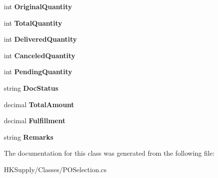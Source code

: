 \begin{DoxyCompactItemize}
int {\bfseries Original\+Quantity}
\item 
\mbox{\label{class_h_k_supply_1_1_classes_1_1_p_o_selection_a0173e2a46bcf6a7193c4f8f449b0e98b}} 
int {\bfseries Total\+Quantity}
\item 
\mbox{\label{class_h_k_supply_1_1_classes_1_1_p_o_selection_a4558c8fb6b03a0609eb6418b95196519}} 
int {\bfseries Delivered\+Quantity}
\item 
\mbox{\label{class_h_k_supply_1_1_classes_1_1_p_o_selection_afcdb48abdb867c3fa52f08087f1272ba}} 
int {\bfseries Canceled\+Quantity}
\item 
\mbox{\label{class_h_k_supply_1_1_classes_1_1_p_o_selection_a21b9c87f9ffe98fba310bdf41cff0dc4}} 
int {\bfseries Pending\+Quantity}
\item 
\mbox{\label{class_h_k_supply_1_1_classes_1_1_p_o_selection_abebcd2d0230ddd1c2f3ceb7cb1f999c5}} 
string {\bfseries Doc\+Status}
\item 
\mbox{\label{class_h_k_supply_1_1_classes_1_1_p_o_selection_a30c4ee4350eacd53e3174e827fb5be79}} 
decimal {\bfseries Total\+Amount}
\item 
\mbox{\label{class_h_k_supply_1_1_classes_1_1_p_o_selection_abea970042645a8f72b2b72b8973e2b5d}} 
decimal {\bfseries Fulfillment}
\item 
\mbox{\label{class_h_k_supply_1_1_classes_1_1_p_o_selection_a280f84fcaba59d13a117421f8fe31043}} 
string {\bfseries Remarks}
\end{DoxyCompactItemize}


The documentation for this class was generated from the following file\+:\begin{DoxyCompactItemize}
\item 
H\+K\+Supply/\+Classes/P\+O\+Selection.\+cs\end{DoxyCompactItemize}
